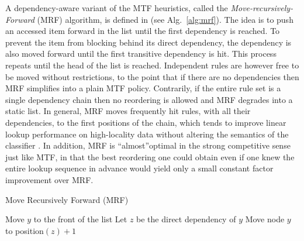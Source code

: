


A dependency-aware variant of the MTF heuristics, called the \emph{Move-recursively-Forward} (MRF) algorithm, is defined in \cite{10228937} (see Alg.~\ref{alg:mrf}). The idea is to push an accessed item forward in the list until the first dependency is reached. To prevent the item from blocking behind its direct dependency, the dependency is also moved forward until the first transitive dependency is hit. This process repeats until the head of the list is reached.  Independent rules are however free to be moved without restrictions, to the point that if there are no dependencies then MRF simplifies into a plain MTF policy.  Contrarily, if the entire rule set is a single dependency chain then no reordering is allowed and MRF degrades into a static list. In general, MRF moves frequently hit rules, with all their dependencies, to the first positions of the chain, which tends to improve linear lookup performance on high-locality data without altering the semantics of the classifier \cite{10228937}. In addition, MRF is ``almost''optimal in the strong competitive sense just like MTF, in that the best reordering one could obtain even if one knew the entire lookup sequence in advance would yield only a small constant factor improvement over MRF.

\begin{algorithm}[t]
  \caption{Move Recursively Forward (MRF)}
  \label{alg:mrf}
  \begin{small}
    \begin{algorithmic}[1]
      \State Move $y$ to the front of the list
      \Else
      \State Let $z$ be the direct dependency of $y$
      \State Move node $y$ to position$(z) + 1$
      \State {}
      \EndIf
      \EndProcedure
    \end{algorithmic}
  \end{small}
\end{algorithm}

